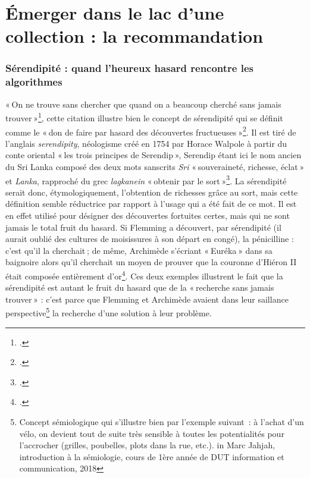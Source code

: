 \chapter{Émerger dans le lac d'une collection : la recommandation}

\subsection{Sérendipité : quand l'heureux hasard rencontre les algorithmes}

« On ne trouve sans chercher que quand on a beaucoup cherché sans jamais trouver »\footcite{2015}, cette citation illustre bien le concept de sérendipité qui se définit comme le « don de faire par hasard des découvertes fructueuses »\footcite{zotero-224}. Il est tiré de l’anglais \textit{serendipity}, néologisme créé en 1754 par Horace Walpole à partir du conte oriental « les trois principes de Serendip », Serendip étant ici le nom ancien du Sri Lanka composé des deux mots sanscrits \textit{Sri} « souveraineté, richesse, éclat » et \textit{Lanka}, rapproché du grec \textit{lagkanein} « obtenir par le sort »\footcite{zotero-224}. La sérendipité serait donc, étymologiquement, l’obtention de richesses grâce au sort, mais cette définition semble réductrice par rapport à l’usage qui a été fait de ce mot. Il est en effet utilisé pour désigner des découvertes fortuites certes, mais qui ne sont jamais le total fruit du hasard. Si Flemming a découvert, par sérendipité (il aurait oublié des cultures de moisissures à son départ en congé), la pénicilline : c’est qu’il la cherchait ; de même, Archimède s’écriant « Euréka » dans sa baignoire alors qu’il cherchait un moyen de prouver que la couronne d’Hiéron II était composée entièrement d'or\footcite[Annexe 1]{michel2019}. Ces deux exemples illustrent le fait que la sérendipité est autant le fruit du hasard que de la « recherche sans jamais trouver » : c’est parce que Flemming et Archimède avaient dans leur saillance perspective\footnote{Concept sémiologique qui s’illustre bien par l’exemple suivant : à l’achat d’un vélo, on devient tout de suite très sensible à toutes les potentialités pour l’accrocher (grilles, poubelles, plots dans la rue, etc.). in Marc Jahjah, introduction à la sémiologie, cours de 1ère année de DUT information et communication, 2018 } la recherche d’une solution à leur problème.

